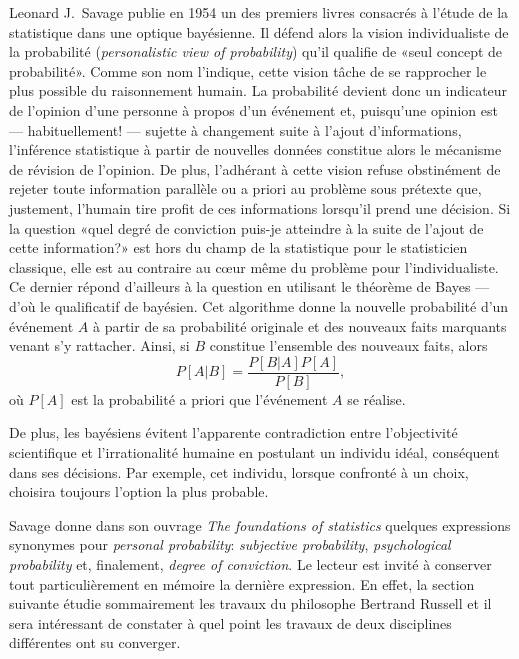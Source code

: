 Leonard J.\ Savage publie en 1954 \citep{Savage:foundations:1954} un des premiers
livres consacrés à l'étude de la statistique dans une optique
bayésienne. Il défend alors la vision individualiste de la probabilité
(\emph{personalistic view of probability}) qu'il qualifie de «seul
concept de probabilité». Comme son nom l'indique, cette vision tâche
de se rapprocher le plus possible du raisonnement humain.  La
probabilité devient donc un indicateur de l'opinion d'une personne à
propos d'un événement et, puisqu'une opinion est --- habituellement!
--- sujette à changement suite à l'ajout d'informations, l'inférence
statistique à partir de nouvelles données constitue alors le mécanisme
de révision de l'opinion. De plus, l'adhérant à cette vision refuse
obstinément de rejeter toute information parallèle ou a priori au
problème sous prétexte que, justement, l'humain tire profit de ces
informations lorsqu'il prend une décision. Si la question «quel degré
de conviction puis-je atteindre à la suite de l'ajout de cette information?»
est hors du champ de la statistique pour le statisticien classique,
elle est au contraire au c{\oe}ur même du problème pour
l'individualiste.  Ce dernier répond d'ailleurs à la question en
utilisant le théorème de Bayes --- d'où le qualificatif de bayésien.
Cet algorithme donne la nouvelle probabilité d'un événement $A$ à
partir de sa probabilité originale et des nouveaux faits marquants
venant s'y rattacher. Ainsi, si $B$ constitue l'ensemble des nouveaux
faits, alors
\begin{equation*}
  P[A|B]= \frac{P[B|A]P[A]}{P[B]},
\end{equation*}
où $P[A]$ est la probabilité a priori que l'événement $A$ se réalise.

De plus, les bayésiens évitent l'apparente contradiction entre
l'objectivité scientifique et l'irrationalité humaine en postulant un
individu idéal, conséquent dans ses décisions. Par exemple, cet
individu, lorsque confronté à un choix, choisira toujours l'option la
plus probable.

Savage donne dans son ouvrage \emph{The foundations of statistics}
quelques expressions synonymes pour \emph{personal probability}:
\emph{subjective probability}, \emph{psychological probability} et,
finalement, \emph{degree of conviction}. Le lecteur est invité à
conserver tout particulièrement en mémoire la dernière expression. En
effet, la section suivante étudie sommairement les travaux du
philosophe Bertrand Russell et il sera intéressant de constater à quel
point les travaux de deux disciplines différentes ont su converger.

